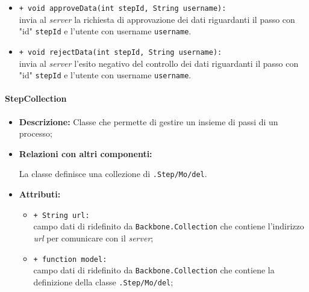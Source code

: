 \begin{flushleft}
\begin{itemize}
\begin{sloppypar}
\begin{itemize}
\item \texttt{+ void approveData(int stepId, String username):}\\ invia al \textit{server} la richiesta di approvazione dei dati riguardanti il passo con "id" \texttt{stepId} e l'utente con username \texttt{username}.
\item \texttt{+ void rejectData(int stepId, String username):}\\ invia al \textit{server} l'esito negativo del controllo dei dati riguardanti il passo con "id" \texttt{stepId} e l'utente con username \texttt{username}.
\end{itemize}
\end{sloppypar}
\end{itemize}
\end{flushleft}

\paragraph{StepCollection}
\label{stepCollection}
\begin{flushleft}
\begin{itemize}
\item \textbf{Descrizione:} Classe che permette di gestire un insieme di passi di un processo;
\item \textbf{Relazioni con altri componenti:}
\begin{sloppypar}
La classe definisce una collezione di \texttt{\model{}.Step\fshyp{}Mo\fshyp{}del}.
\end{sloppypar}
\item \textbf{Attributi:}
\begin{sloppypar}
\begin{itemize}
\item \texttt{+ String url:}\\ campo dati di ridefinito da \texttt{Backbone.Collection} che contiene l'indirizzo \textit{url} per comunicare con il \textit{server};
\item \texttt{+ function model:}\\ campo dati di ridefinito da \texttt{Backbone.Collection} che contiene la definizione della classe \texttt{\model{}.Step\fshyp{}Mo\fshyp{}del};
\end{itemize}
\end{sloppypar}
\end{itemize}
\end{flushleft}